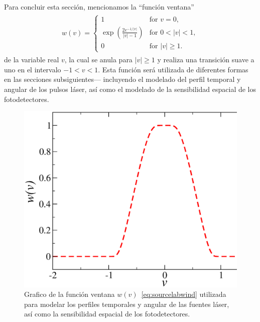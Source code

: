 Para concluir esta sección, mencionamos la ``función ventana''~\cite{Bruno2014}
\begin{equation}
\begin{aligned}
\begin{split}
w(v)=
\begin{cases}
  1 &\text{for} \, \, v = 0, \\
       \exp{\left(\frac{2e^{-1/|v|}}{|v|-1}\right)} & \text{for} \, \, 0 < |v| < 1, \\
       0 &\text{for} \, \, |v| \geq 1.
     \end{cases}
\end{split}
\end{aligned}
\label{eq:sourcelabwind}
\end{equation}
de la variable real $v$, la cual se anula para $|v|\geq 1$ y realiza 
una transición suave a uno en el intervalo $-1 < v < 1$. Esta función 
será utilizada de diferentes formas en las secciones subsiguientes---
incluyendo el modelado del perfil temporal y angular de los pulsos láser, 
así como el modelado de la sensibilidad espacial de los fotodetectores.
\begin{figure}[h!]
\centering
  \includegraphics[width=0.5\linewidth]{figuras/windowed.eps}
  \caption{Grafico de la función ventana $w(v)$~\eqref{eq:sourcelabwind} utilizada 
  para modelar los perfiles temporales y angular de las fuentes láser, 
  así como la sensibilidad espacial de los fotodetectores.}
 \label{fig:window}
\end{figure}


